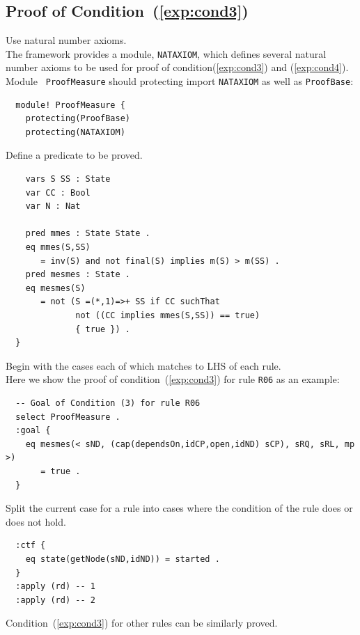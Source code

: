 \documentclass[12pt]{report}
\begin{document}
\subsection{Proof of Condition~(\ref{exp:cond3})}
\label{sec:TOSCAmesmes}
 Use natural number axioms. \\
The framework provides a module, {\tt NATAXIOM}, which defines several
natural number axioms to be used for proof of
condition(\ref{exp:cond3}) and (\ref{exp:cond4}).  Module {\tt
  ProofMeasure} should protecting import {\tt NATAXIOM} as well as
{\tt ProofBase}:
\small
\begin{verbatim}
  module! ProofMeasure {
    protecting(ProofBase)
    protecting(NATAXIOM)
\end{verbatim}
\normalsize

 Define a predicate to be proved.
\small
\begin{verbatim}
    vars S SS : State
    var CC : Bool
    var N : Nat
      
    pred mmes : State State .
    eq mmes(S,SS)
       = inv(S) and not final(S) implies m(S) > m(SS) .
    pred mesmes : State .
    eq mesmes(S)
       = not (S =(*,1)=>+ SS if CC suchThat
              not ((CC implies mmes(S,SS)) == true)
              { true }) .
  }
\end{verbatim}
\normalsize

 Begin with the cases each of which matches to
LHS of each rule. \\ 
Here we show the proof of condition~(\ref{exp:cond3}) for rule {\tt R06}
as an example:
\small
\begin{verbatim}
  -- Goal of Condition (3) for rule R06
  select ProofMeasure .
  :goal {
    eq mesmes(< sND, (cap(dependsOn,idCP,open,idND) sCP), sRQ, sRL, mp >)
       = true .
  }
\end{verbatim}
\normalsize

 Split the current case for a rule into
cases where the condition of the rule does or does not hold. 
\small
\begin{verbatim}
  :ctf {
    eq state(getNode(sND,idND)) = started .
  }
  :apply (rd) -- 1
  :apply (rd) -- 2
\end{verbatim}
\normalsize
Condition~(\ref{exp:cond3}) for other rules can be similarly proved.
\end{document}
